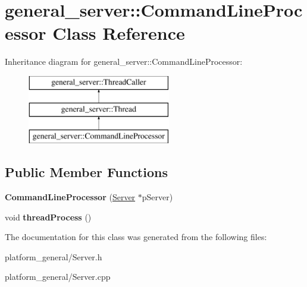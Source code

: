 \hypertarget{classgeneral__server_1_1CommandLineProcessor}{\section{general\-\_\-server\-:\-:\-Command\-Line\-Processor \-Class \-Reference}
\label{classgeneral__server_1_1CommandLineProcessor}
}
\-Inheritance diagram for general\-\_\-server\-:\-:\-Command\-Line\-Processor\-:\begin{figure}[H]
\begin{center}
\leavevmode
\includegraphics[height=3.000000cm]{classgeneral__server_1_1CommandLineProcessor}
\end{center}
\end{figure}
\subsection*{\-Public \-Member \-Functions}
\begin{DoxyCompactItemize}
\item 
\hypertarget{classgeneral__server_1_1CommandLineProcessor_a4f00cdec76d35f289572113ebdae3d56}{{\bfseries \-Command\-Line\-Processor} (\hyperlink{classgeneral__server_1_1Server}{\-Server} $\ast$p\-Server)}\label{classgeneral__server_1_1CommandLineProcessor_a4f00cdec76d35f289572113ebdae3d56}

\item 
\hypertarget{classgeneral__server_1_1CommandLineProcessor_a92665eff081f3c933e5ecb995313be89}{void {\bfseries thread\-Process} ()}\label{classgeneral__server_1_1CommandLineProcessor_a92665eff081f3c933e5ecb995313be89}

\end{DoxyCompactItemize}


\-The documentation for this class was generated from the following files\-:\begin{DoxyCompactItemize}
\item 
platform\-\_\-general/\-Server.\-h\item 
platform\-\_\-general/\-Server.\-cpp\end{DoxyCompactItemize}
